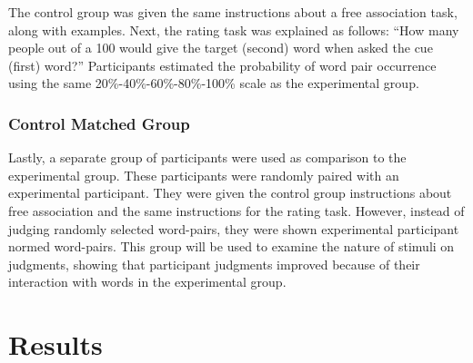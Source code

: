 \documentclass[english,man]{apa6}
\theoremstyle{definition}
\theoremstyle{definition}
\theoremstyle{definition}
\theoremstyle{remark}
\begin{document}
The control group was given the same instructions about a free
association task, along with examples. Next, the rating task was
explained as follows: \enquote{How many people out of a 100 would give
the target (second) word when asked the cue (first) word?} Participants
estimated the probability of word pair occurrence using the same
20\%-40\%-60\%-80\%-100\% scale as the experimental group.

\subsubsection{Control Matched Group}\label{control-matched-group}

Lastly, a separate group of participants were used as comparison to the
experimental group. These participants were randomly paired with an
experimental participant. They were given the control group instructions
about free association and the same instructions for the rating task.
However, instead of judging randomly selected word-pairs, they were
shown experimental participant normed word-pairs. This group will be
used to examine the nature of stimuli on judgments, showing that
participant judgments improved because of their interaction with words
in the experimental group.

\section{Results}\label{results}
\end{document}

